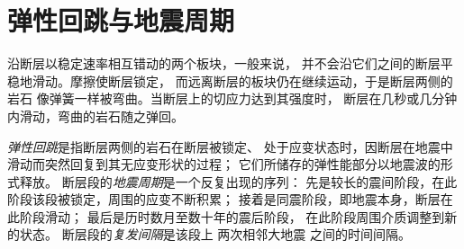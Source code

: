 \section{弹性回跳与地震周期}\label{sec:b1:earthquake-source:cycle}

沿断层以稳定速率相互错动的两个板块，一般来说，
并不会沿它们之间的断层平稳地滑动。摩擦使断层锁定，
而远离断层的板块仍在继续运动，于是断层两侧的岩石
像弹簧一样被弯曲。当断层上的切应力达到其强度时，
断层在几秒或几分钟内滑动，弯曲的岩石随之弹回。

\begin{definition}\label{def:b1:earthquake-source:seismic-cycle}
\emph{弹性回跳}是指断层两侧的岩石在断层被锁定、
处于应变状态时，因断层在地震中滑动而突然回复到其无应变形状的过程；
它们所储存的弹性能部分以地震波的形式释放。
断层段的\emph{地震周期}是一个反复出现的序列：
先是较长的震间阶段，在此阶段该段被锁定，周围的应变不断积累；
接着是同震阶段，即地震本身，断层在此阶段滑动；
最后是历时数月至数十年的震后阶段，
在此阶段周围介质调整到新的状态。
断层段的\emph{复发间隔}是该段上
两次相邻大地震
之间的时间间隔。
\end{definition}

